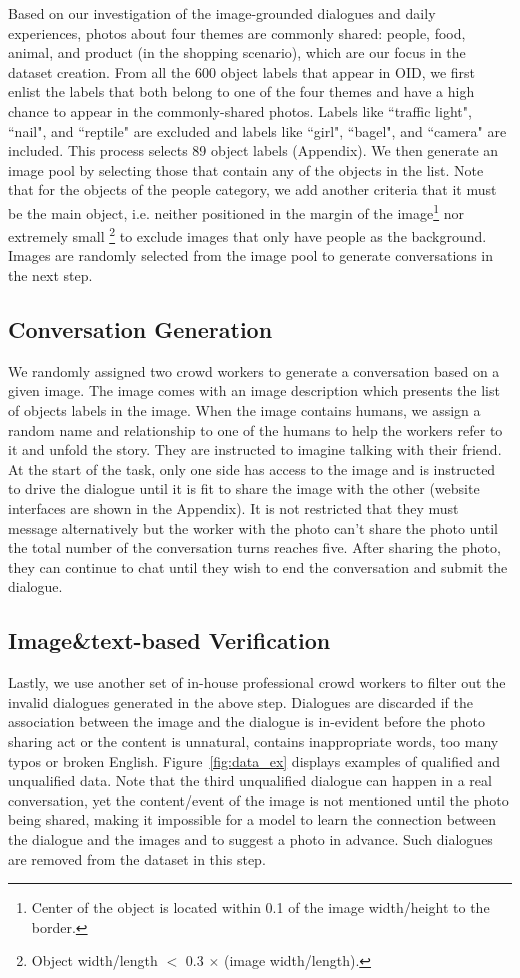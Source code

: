 \documentclass[11pt,a4paper]{article}
\begin{document}
Based on our investigation of the image-grounded dialogues and daily experiences, photos about four themes are commonly shared: people, food, animal, and product (in the shopping scenario), which are our focus in the dataset creation. From all the 600 object labels that appear in OID, we first enlist the labels that both belong to one of the four themes and have a high chance to appear in the commonly-shared photos. Labels like ``traffic light", ``nail", and ``reptile" are excluded and labels like ``girl", ``bagel", and ``camera" are included. This process selects 89 object labels (Appendix). We then generate an image pool by selecting those that contain any of the objects in the list. Note that for the objects of the people category, we add another criteria that it must be the main object, i.e. neither positioned in the margin of the image\footnote{Center of the object is located within 0.1 of the image width/height to the border.} nor extremely small \footnote{Object width/length $<$ 0.3 $\times$ (image width/length).} to exclude images that only have people as the background. Images are randomly selected from the image pool to generate conversations in the next step. 


\subsection{Conversation Generation}
We randomly assigned two crowd workers to generate a conversation based on a given image. The image comes with an image description which presents the list of objects labels in the image. When the image contains humans, we assign a random name and relationship to one of the humans to help the workers refer to it and unfold the story. They are instructed to imagine talking with their friend. At the start of the task, only one side has access to the image and is instructed to drive the dialogue until it is fit to share the image with the other (website interfaces are shown in the Appendix). It is not restricted that they must message alternatively but the worker with the photo can't share the photo until the total number of the conversation turns reaches five. After sharing the photo, they can continue to chat until they wish to end the conversation and submit the dialogue. 

\subsection{Image\&text-based Verification}
Lastly, we use another set of in-house professional crowd workers to filter out the invalid dialogues generated in the above step. Dialogues are discarded if the association between the image and the dialogue is in-evident before the photo sharing act or the content is unnatural, contains inappropriate words, too many typos or broken English.
Figure~\ref{fig:data_ex} displays examples of qualified and unqualified data. Note that the third unqualified dialogue can happen in a real conversation, yet the content/event of the image is not mentioned until the photo being shared, making it impossible for a model to learn the connection between the dialogue and the images and to suggest a photo in advance. Such dialogues are removed from the dataset in this step.
\end{document}
